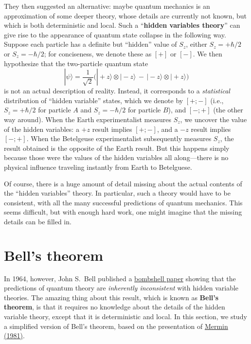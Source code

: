 \documentclass[pra,11pt]{revtex4}
\begin{document}
They then suggested an alternative: maybe quantum mechanics is an
approximation of some deeper theory, whose details are currently not
known, but which is both deterministic and local.  Such a
``\textbf{hidden variables theory}'' can give rise to the appearance
of quantum state collapse in the following way.  Suppose each particle
has a definite but ``hidden'' value of $S_z$, either $S_z = +\hbar/2$
or $S_z = -\hbar/2$; for conciseness, we denote these as $[+]$ or
$[-]$.  We then hypothesize that the two-particle quantum state
$$|\psi\rangle = \frac{1}{\sqrt{2}} \Big(|\!+\!z\rangle\otimes|\!-\!z\rangle \,-\, |\!-\!z\rangle\otimes|\!+\!z\rangle\Big)$$
is not an actual description of reality.  Instead, it corresponds to a
\textit{statistical} distribution of ``hidden variable'' states, which
we denote by $[+;-]$ (i.e., $S_z = +\hbar/2$ for particle $A$ and $S_z
= -\hbar/2$ for particle $B$), and $[-;+]$ (the other way around).
When the Earth experimentalist measures $S_z$, we uncover the value of
the hidden variables: a $+z$ result implies $[+;-]$, and a $-z$ result
implies $[-;+]$.  When the Betelgeuse experimentalist subsequently
measures $S_z$, the result obtained is the opposite of the Earth
result.  But this happens simply because those were the values of the
hidden variables all along---there is no physical influence traveling
instantly from Earth to Betelguese.

Of course, there is a huge amount of detail missing about the actual
contents of the ``hidden variables'' theory.  In particular, such a
theory would have to be consistent, with all the many successful
predictions of quantum mechanics.  This seems difficult, but with
enough hard work, one might imagine that the missing details can be
filled in.

\section{Bell's theorem}

In 1964, however, John S.~Bell published a
\hyperref[cite:bell]{bombshell paper} showing that the predictions of
quantum theory are \textit{inherently inconsistent} with hidden
variable theories.  The amazing thing about this result, which is
known as \textbf{Bell's theorem}, is that it requires no knowledge
about the details of the hidden variable theory, except that it is
deterministic and local.  In this section, we study a simplified
version of Bell's theorem, based on the presentation of
\hyperref[cite:mermin]{Mermin (1981)}.
\end{document}
